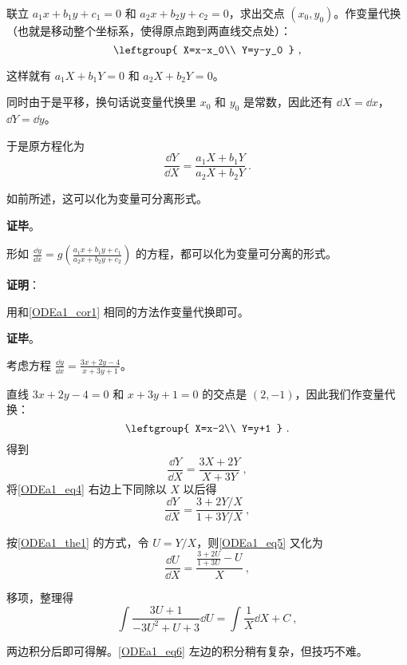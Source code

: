 联立 $a_1x+b_1y+c_1=0$ 和 $a_2x+b_2y+c_2=0$，求出交点 $(x_0, y_0)$。作变量代换（也就是移动整个坐标系，使得原点跑到两直线交点处）：
\begin{equation}
\leftgroup{
    X=x-x_0\\
    Y=y-y_0
}~,
\end{equation}

这样就有 $a_1X+b_1Y=0$ 和 $a_2X+b_2Y=0$。

同时由于是平移，换句话说变量代换里 $x_0$ 和 $y_0$ 是常数，因此还有 $\dd X=\dd x$，$\dd Y=\dd y$。

于是原方程化为
\begin{equation}
\frac{\dd Y}{\dd X}=\frac{a_1X+b_1Y}{a_2X+b_2Y}~.
\end{equation}

如前所述，这可以化为变量可分离形式。

\textbf{证毕}。

\begin{corollary}{}
形如 $\frac{\dd y}{\dd x}=g(\frac{a_1x+b_1y+c_1}{a_2x+b_2y+c_2})$ 的方程，都可以化为变量可分离的形式。
\end{corollary}

\textbf{证明}：

用和\autoref{ODEa1_cor1} 相同的方法作变量代换即可。

\textbf{证毕}。





\begin{example}{}
考虑方程 $\frac{\dd y}{\dd x}=\frac{3x+2y-4}{x+3y+1}$。

直线 $3x+2y-4=0$ 和 $x+3y+1=0$ 的交点是 $(2, -1)$，因此我们作变量代换：
\begin{equation}
\leftgroup{
    X=x-2\\
    Y=y+1
}~.
\end{equation}
得到
\begin{equation}\label{ODEa1_eq4}
\frac{\dd Y}{\dd X}=\frac{3X+2Y}{X+3Y}~,
\end{equation}
将\autoref{ODEa1_eq4} 右边上下同除以 $X$ 以后得
\begin{equation}\label{ODEa1_eq5}
\frac{\dd Y}{\dd X}=\frac{3+2Y/X}{1+3Y/X}~,
\end{equation}

按\autoref{ODEa1_the1} 的方式，令 $U=Y/X$，则\autoref{ODEa1_eq5} 又化为
\begin{equation}
\frac{\dd U}{\dd X}=\frac{\frac{3+2U}{1+3U}-U}{X}~,
\end{equation}

移项，整理得
\begin{equation}\label{ODEa1_eq6}
\int\frac{3U+1}{-3U^2+U+3}\dd U=\int\frac{1}{X}\dd X+C~,
\end{equation}

两边积分后即可得解。\autoref{ODEa1_eq6} 左边的积分稍有复杂，但技巧不难。

\end{example}









